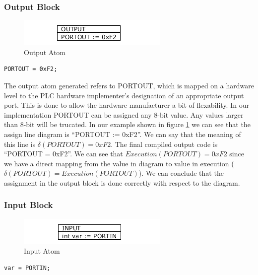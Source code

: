 \subsubsection{Output Block}

\begin{figure}[h]
	\centering
	\includegraphics[width=\imgmedphoto]{./images/correctness_atom_output.png}
	\caption{Output Atom}
	\label{fig:correctness_atom_output}
\end{figure}

\begin{lstlisting}[frame=single]
PORTOUT = 0xF2;
\end{lstlisting}

The output atom generated refers to PORTOUT, which is mapped on a hardware level to the PLC hardware implementer's designation of an appropriate output port. This is done to allow the hardware manufacturer a bit of flexability. In our implementation PORTOUT can be assigned any 8-bit value. Any values larger than 8-bit will be trucated. In our example shown in figure \ref{fig:correctness_atom_output} we can see that the assign line diagram is ``PORTOUT := 0xF2''. We can say that the meaning of this line is $\delta(PORTOUT) = 0xF2$. The final compiled output code is ``PORTOUT = 0xF2''. We can see that $Execution(PORTOUT) = 0xF2$ since we have a direct mapping from the value in diagram to value in execution ($\delta(PORTOUT) = Execution(PORTOUT)$). We can conclude that the assignment in the output block is done correctly with respect to the diagram.


\subsubsection{Input Block}

\begin{figure}[h]
	\centering
	\includegraphics[width=\imgmedphoto]{./images/correctness_atom_input.png}
	\caption{Input Atom}
	\label{fig:correctness_atom_input}
\end{figure}

\begin{lstlisting}[frame=single]
var = PORTIN;
\end{lstlisting}



